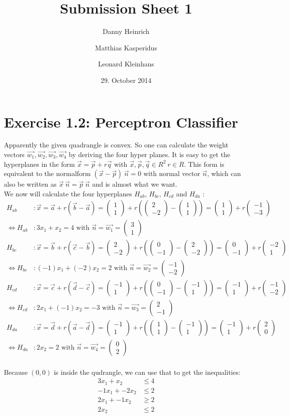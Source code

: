 \documentclass{scrartcl}
\title{Submission Sheet 1}
\author{Danny Heinrich \and Matthias Kasperidus \and Leonard Kleinhans}
\date{29. October 2014}
\newcommand*\colvec[2]{
        \begin{pmatrix} #1 \\ #2 \end{pmatrix}
}
\begin{document}
\maketitle

\section{Exercise 1.2: Perceptron Classifier}

Apparently the given quadrangle is convex. So one can calculate the weight vectors $\vec{w_1},\vec{w_2},\vec{w_3},\vec{w_4}$ by deriving the four hyper planes.
It is easy to get the hyperplanes in the form $\vec{x} = \vec{p} + r \vec{q}$ with $\vec{x},\vec{p},\vec{q} \in R^2 ~r \in R$. This form is equivalent to the normalform $(\vec{x}-\vec{p})~\vec{n} = 0$ with normal vector $\vec{n}$, which can also be written as $\vec{x} ~ \vec{n} = \vec{p} ~ \vec{n}$ and is almost what we want. \\
We now will calculate the four hyperplanes $H_{ab}$, $H_{bc}$, $H_{cd}$ and $H_{da}$ : \\
\begin{align*}
H_{ab}&: \vec{x} = \vec{a} + r (\vec{b}-\vec{a}) = \colvec{1}{1} + r \left(\colvec{2}{-2} - \colvec{1}{1}\right) = \colvec{1}{1} + r \colvec{-1}{-3} \\
\Leftrightarrow H_{ab}&: 3x_1 + x_2 = 4 \text{~with~} \vec{n} = \vec{w_1} = \colvec{3}{1} \\
H_{bc}&: \vec{x} = \vec{b} + r (\vec{c}-\vec{b}) = \colvec{2}{-2} + r \left(\colvec{0}{-1} - \colvec{2}{-2}\right) = \colvec{0}{-1} + r \colvec{-2}{1} \\
\Leftrightarrow H_{bc}&: (-1) x_1 + (-2) x_2 = 2 \text{~with~} \vec{n} = \vec{w_2} = \colvec{-1}{-2}\\
H_{cd}&: \vec{x} = \vec{c} + r (\vec{d}-\vec{c}) = \colvec{-1}{1} + r \left(\colvec{0}{-1} - \colvec{-1}{1}\right) = \colvec{-1}{1} + r \colvec{-1}{-2} \\
\Leftrightarrow H_{cd}&: 2 x_1 + (-1) x_2 = -3 \text{~with~} \vec{n} = \vec{w_3} = \colvec{2}{-1}\\
H_{da}&: \vec{x} = \vec{d} + r (\vec{a}-\vec{d}) = \colvec{-1}{1} + r \left(\colvec{1}{1} - \colvec{-1}{1}\right) = \colvec{-1}{1} + r \colvec{2}{0} \\
\Leftrightarrow H_{da}&: 2 x_2 = 2 \text{~with~} \vec{n} = \vec{w_4} = \colvec{0}{2}\\
\end{align*}

Because $(0,0)$ is inside the qudrangle, we can use that to get the inequalities:
\begin{align*}
3 x_1 + x_2 &\le 4 \\
-1 x_1 + -2 x_2 &\le 2 \\
2 x_1 + -1 x_2 &\ge 2 \\
2 x_2 &\le 2 \\
\end{align*}
\end{document}
